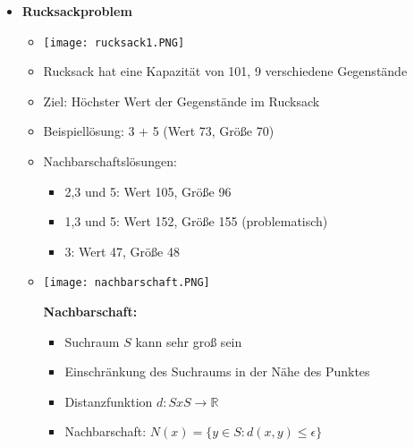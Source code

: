 \begin{itemize}
        \item \textbf{Rucksackproblem}
            \begin{itemize}
                \item[] \texttt{[image: rucksack1.PNG]}
                \item Rucksack hat eine Kapazität von 101, 9 verschiedene Gegenstände
                \item Ziel: Höchster Wert der Gegenstände im Rucksack
                \item Beispiellösung: 3 + 5 (Wert 73, Größe 70)
                \item Nachbarschaftslösungen: 
                    \begin{itemize}
                        \item 2,3 und 5: Wert 105, Größe 96
                        \item 1,3 und 5: Wert 152, Größe 155 (problematisch)
                        \item 3: Wert 47, Größe 48
                    \end{itemize}
                \item[]
                    \begin{minipage}{0.4\textwidth}
                        \texttt{[image: nachbarschaft.PNG]}
                    \end{minipage}
                    \begin{minipage}{0.5\textwidth}
                        \textbf{Nachbarschaft:}
                        \begin{itemize}
                            \item Suchraum $S$ kann sehr groß sein
                            \item Einschränkung des Suchraums in der Nähe des Punktes
                            \item Distanzfunktion $d: S x S \rightarrow \mathbb{R}$
                            \item Nachbarschaft: $N(x) = \{y \in S: d(x,y) \leq \epsilon\}$
                        \end{itemize}
                    \end{minipage}
            \end{itemize}


\end{itemize}
